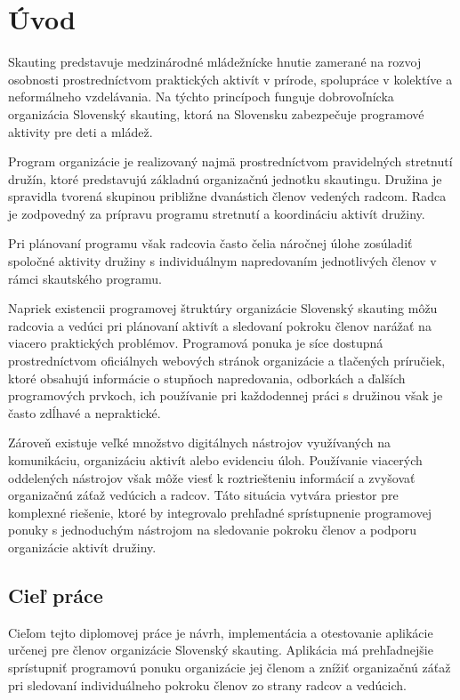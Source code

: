 \chapter*{Úvod}
Skauting predstavuje medzinárodné mládežnícke hnutie zamerané na rozvoj osobnosti prostredníctvom praktických aktivít v prírode, spolupráce v kolektíve a neformálneho vzdelávania. Na týchto princípoch funguje dobrovoľnícka organizácia Slovenský skauting, ktorá na Slovensku zabezpečuje programové aktivity pre deti a mládež.

Program organizácie je realizovaný najmä prostredníctvom pravidelných stretnutí družín, ktoré predstavujú základnú organizačnú jednotku skautingu. Družina je spravidla tvorená skupinou približne dvanástich členov vedených radcom. Radca je zodpovedný za prípravu programu stretnutí a koordináciu aktivít družiny.

Pri plánovaní programu však radcovia často čelia náročnej úlohe zosúladiť spoločné aktivity družiny s individuálnym napredovaním jednotlivých členov v rámci skautského programu.

Napriek existencii programovej štruktúry organizácie Slovenský skauting môžu radcovia a vedúci pri plánovaní aktivít a sledovaní pokroku členov narážať na viacero praktických problémov. Programová ponuka je síce dostupná prostredníctvom oficiálnych webových stránok organizácie a tlačených príručiek, ktoré obsahujú informácie o stupňoch napredovania, odborkách a ďalších programových prvkoch, ich používanie pri každodennej práci s družinou však je často zdĺhavé a nepraktické.

Zároveň existuje veľké množstvo digitálnych nástrojov využívaných na komunikáciu, organizáciu aktivít alebo evidenciu úloh. Používanie viacerých oddelených nástrojov však môže viesť k roztriešteniu informácií a zvyšovať organizačnú záťaž vedúcich a radcov. Táto situácia vytvára priestor pre komplexné riešenie, ktoré by integrovalo prehľadné sprístupnenie programovej ponuky s jednoduchým nástrojom na sledovanie pokroku členov a podporu organizácie aktivít družiny.

\section*{Cieľ práce}
Cieľom tejto diplomovej práce je návrh, implementácia a otestovanie aplikácie určenej pre členov organizácie Slovenský skauting. Aplikácia má prehľadnejšie sprístupniť programovú ponuku organizácie jej členom a znížiť organizačnú záťaž pri sledovaní individuálneho pokroku členov zo strany radcov a vedúcich.

